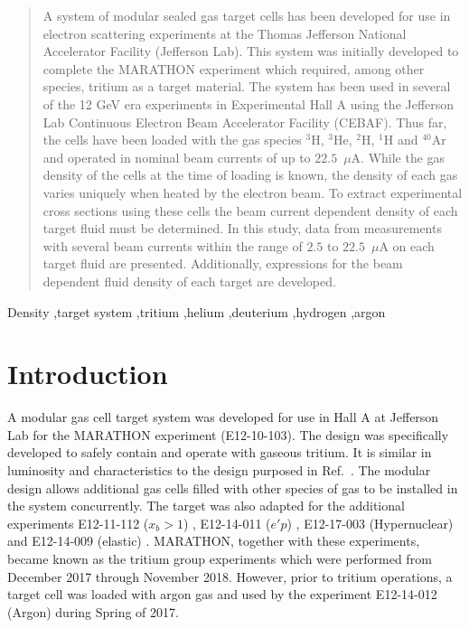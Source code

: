 \documentclass[review,numbers,sort&compress]{elsarticle}
\begin{document}
\begin{frontmatter}
\begin{abstract}
A system of modular sealed gas target cells has been developed for use in electron scattering experiments 
at the Thomas Jefferson National Accelerator Facility (Jefferson Lab). This system was initially developed 
to complete the MARATHON experiment which required, among other species, tritium as a target material. 
The system has been used in several of the 12 GeV era experiments in Experimental Hall A using the Jefferson Lab 
Continuous Electron Beam Accelerator Facility (CEBAF). Thus far, the cells have been loaded with the gas 
species $^{3}$H, $^{3}$He, $^{2}$H, $^{1}$H and $^{40}$Ar and operated in nominal beam currents of up to $22.5$~$\mu$A.  
While the gas density of the cells at the time of loading is known, 
the density of each gas varies uniquely when heated by the electron beam. To extract experimental cross sections using 
these cells the beam current dependent density of each target fluid must be determined. In this study, data from measurements 
with several beam currents within the range of $2.5$ to $22.5$~$\mu$A on each target fluid are presented. Additionally, 
expressions for the beam dependent fluid density of each target are developed.
\end{abstract}

\begin{keyword}
Density \sep target system
\sep tritium
\sep helium 
\sep deuterium
\sep hydrogen
\sep argon
\end{keyword}
\end{frontmatter}


\section{Introduction}

A modular gas cell target system was developed for use in Hall A at Jefferson Lab for the MARATHON experiment (E12-10-103)\cite{marathon}.
The design was specifically developed to safely contain and operate with gaseous tritium.  It is similar in luminosity and characteristics 
to the design purposed in Ref.~\cite{Brajuskovic:2013ymh}.
The modular design allows additional gas cells filled with other species of gas to be installed in the system concurrently. The target was 
also adapted for the additional experiments E12-11-112 ($x_{b}>1$) \cite{E12-11-112}, E12-14-011 ($e'p$) \cite{E12-14-011}, 
E12-17-003 (Hypernuclear) \cite{hypernuclear} and E12-14-009 (elastic) \cite{E12-14-009}.  
MARATHON, together with these experiments, became known as the tritium group experiments which were performed from December 2017 
through November 2018. However, prior to tritium operations, a target cell was loaded with argon gas and used by the 
experiment E12-14-012 (Argon) \cite{E12-14-012} during Spring of 2017. 
\end{document}
